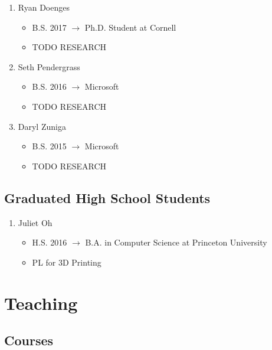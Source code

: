 \documentclass[10pt]{article}
\begin{document}
\begin{enumerate}[resume]
  \item Ryan Doenges
    \begin{itemize}
      \item B.S. 2017 $\rightarrow$ Ph.D. Student at Cornell
      \item TODO RESEARCH
    \end{itemize}

  \item Seth Pendergrass
    \begin{itemize}
      \item B.S. 2016 $\rightarrow$ Microsoft
      \item TODO RESEARCH
    \end{itemize}

  \item Daryl Zuniga
    \begin{itemize}
      \item B.S. 2015 $\rightarrow$ Microsoft
      \item TODO RESEARCH
    \end{itemize}
\end{enumerate}

\subsection*{Graduated High School Students}

\begin{enumerate}[resume]
  \item Juliet Oh
    \begin{itemize}
      \item H.S. 2016 $\rightarrow$ B.A. in Computer Science at Princeton University
      \item PL for 3D Printing
    \end{itemize}
\end{enumerate}


\section*{Teaching}

\subsection*{Courses}
\end{document}

